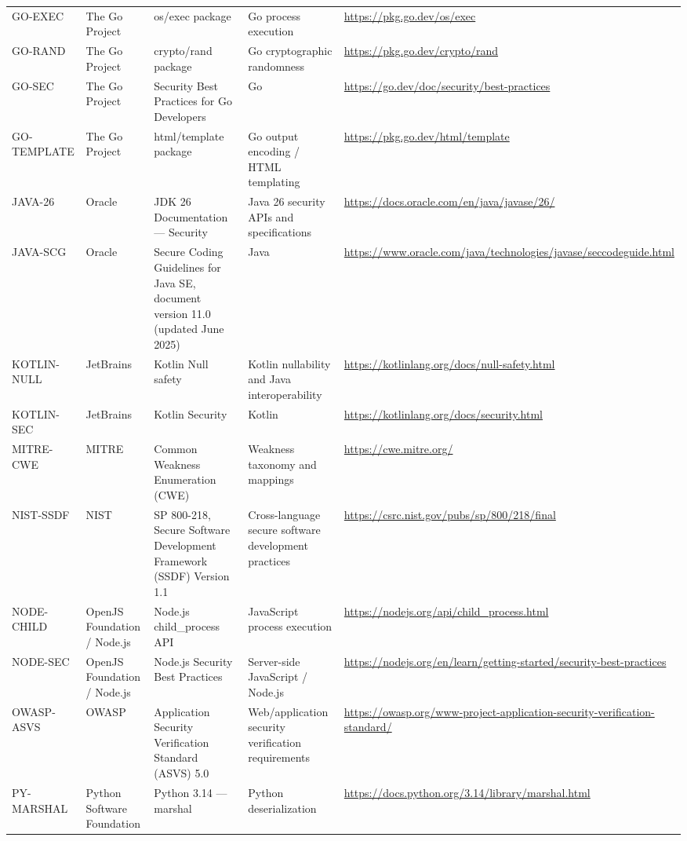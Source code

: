\documentclass[10pt,letterpaper]{article}
\begin{document}
\begin{landscape}
\begin{longtable}{@{}P{0.82in}P{1.23in}P{2.25in}P{1.7in}P{3.0in}@{}}
GO-EXEC & The Go Project & os/exec package & Go process execution & \url{https://pkg.go.dev/os/exec}\\
GO-RAND & The Go Project & crypto/rand package & Go cryptographic randomness & \url{https://pkg.go.dev/crypto/rand}\\
GO-SEC & The Go Project & Security Best Practices for Go Developers & Go & \url{https://go.dev/doc/security/best-practices}\\
GO-TEMPLATE & The Go Project & html/template package & Go output encoding / HTML templating & \url{https://pkg.go.dev/html/template}\\
JAVA-26 & Oracle & JDK 26 Documentation --- Security & Java 26 security APIs and specifications & \url{https://docs.oracle.com/en/java/javase/26/}\\
JAVA-SCG & Oracle & Secure Coding Guidelines for Java SE, document version 11.0 (updated June 2025) & Java & \url{https://www.oracle.com/java/technologies/javase/seccodeguide.html}\\
KOTLIN-NULL & JetBrains & Kotlin Null safety & Kotlin nullability and Java interoperability & \url{https://kotlinlang.org/docs/null-safety.html}\\
KOTLIN-SEC & JetBrains & Kotlin Security & Kotlin & \url{https://kotlinlang.org/docs/security.html}\\
MITRE-CWE & MITRE & Common Weakness Enumeration (CWE) & Weakness taxonomy and mappings & \url{https://cwe.mitre.org/}\\
NIST-SSDF & NIST & SP 800-218, Secure Software Development Framework (SSDF) Version 1.1 & Cross-language secure software development practices & \url{https://csrc.nist.gov/pubs/sp/800/218/final}\\
NODE-CHILD & OpenJS Foundation / Node.js & Node.js child\_process API & JavaScript process execution & \url{https://nodejs.org/api/child_process.html}\\
NODE-SEC & OpenJS Foundation / Node.js & Node.js Security Best Practices & Server-side JavaScript / Node.js & \url{https://nodejs.org/en/learn/getting-started/security-best-practices}\\
OWASP-ASVS & OWASP & Application Security Verification Standard (ASVS) 5.0 & Web/application security verification requirements & \url{https://owasp.org/www-project-application-security-verification-standard/}\\
PY-MARSHAL & Python Software Foundation & Python 3.14 --- marshal & Python deserialization & \url{https://docs.python.org/3.14/library/marshal.html}\\

\end{longtable}
\end{landscape}
\end{document}
